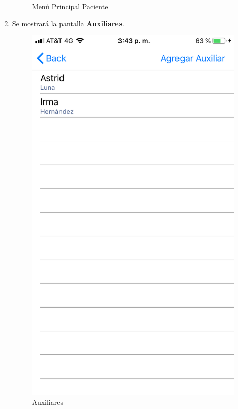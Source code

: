 \begin{enumerate}
\begin{figure}[!htbp]
\begin{center}
			\caption{Menú Principal Paciente}
			\label{fig:mpPaciente6}
		\end{center}
	\end{figure}

	\item Se mostrará la pantalla \textbf{Auxiliares}. 
	\newpage
	\begin{figure}[!htbp]			
		\hypertarget{fig:Auxiliares}{\hspace{1pt}}
		\begin{center}
			\includegraphics[height=0.4\textheight]{Paciente/AgregarAuxiliar/images/Auxiliares}
			\caption{Auxiliares}
			\label{fig:Auxiliares}
		\end{center}
	\end{figure}


\end{enumerate}
